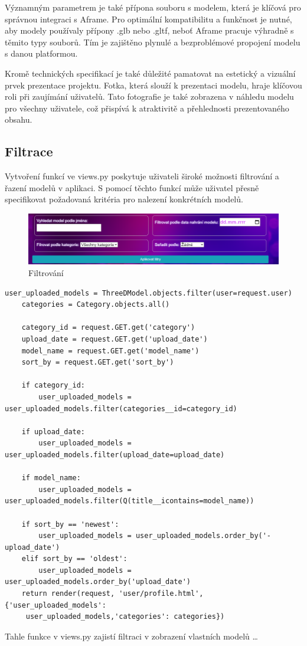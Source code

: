 \documentclass[12pt, a4paper,
twoside,        %
openright
]{report}
\begin{document}
Významným parametrem je také přípona souboru s modelem, která je klíčová pro správnou integraci s Aframe. Pro optimální kompatibilitu a funkčnost je nutné, aby modely používaly přípony .glb nebo .gltf, neboť Aframe pracuje výhradně s těmito typy souborů. Tím je zajištěno plynulé a bezproblémové propojení modelu s danou platformou.

Kromě technických specifikací je také důležité pamatovat na estetický a vizuální prvek prezentace projektu. Fotka, která slouží k prezentaci modelu, hraje klíčovou roli při zaujímání uživatelů. Tato fotografie je také zobrazena v náhledu modelu pro všechny uživatele, což přispívá k atraktivitě a přehlednosti prezentovaného obsahu.

	
	\newpage	
	\subsection[Filtrace]{Filtrace}
	
	Vytvoření funkcí ve views.py poskytuje uživateli široké možnosti filtrování a řazení modelů v aplikaci. S pomocí těchto funkcí může uživatel přesně specifikovat požadovaná kritéria pro nalezení konkrétních modelů.
	\begin{figure}[h]
			\centering
			\includegraphics[width=1\linewidth]{image/Filtrace.png} 
			\caption{Filtrování}
	\end{figure}

\begin{lstlisting}
user_uploaded_models = ThreeDModel.objects.filter(user=request.user)
    categories = Category.objects.all()
    
    category_id = request.GET.get('category')
    upload_date = request.GET.get('upload_date')
    model_name = request.GET.get('model_name')
    sort_by = request.GET.get('sort_by')
   
    if category_id:
        user_uploaded_models = user_uploaded_models.filter(categories__id=category_id)
    
    if upload_date:
        user_uploaded_models = user_uploaded_models.filter(upload_date=upload_date)
   
    if model_name:
        user_uploaded_models = user_uploaded_models.filter(Q(title__icontains=model_name))
   
    if sort_by == 'newest':
        user_uploaded_models = user_uploaded_models.order_by('-upload_date')
    elif sort_by == 'oldest':
        user_uploaded_models = user_uploaded_models.order_by('upload_date')
    return render(request, 'user/profile.html', {'user_uploaded_models':
     user_uploaded_models,'categories': categories})
\end{lstlisting}
Tahle funkce v views.py zajistí filtraci v zobrazení vlastních modelů \dots
\end{document}
